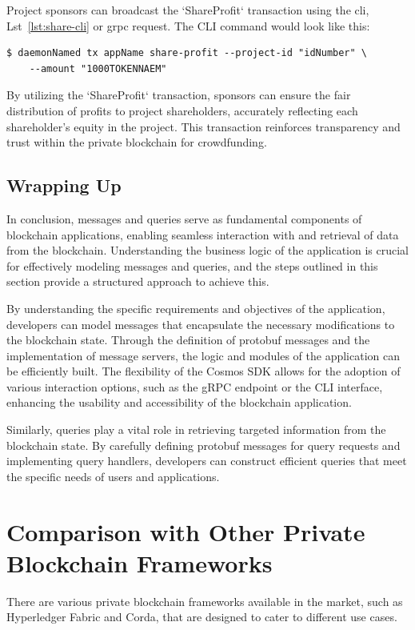 Project sponsors can broadcast the `ShareProfit` transaction using the \gls{cli}, Lst~\ref{lst:share-cli} or \gls{grpc} request. The CLI command would look like this:

\begin{verbatim}
$ daemonNamed tx appName share-profit --project-id "idNumber" \
    --amount "1000TOKENNAEM"
\end{verbatim}

By utilizing the `ShareProfit` transaction, sponsors can ensure the fair distribution of profits to project shareholders, accurately reflecting each shareholder's equity in the project. This transaction reinforces transparency and trust within the private blockchain for crowdfunding.

\subsection{Wrapping Up}

In conclusion, messages and queries serve as fundamental components of blockchain applications, enabling seamless interaction with and retrieval of data from the blockchain. Understanding the business logic of the application is crucial for effectively modeling messages and queries, and the steps outlined in this section provide a structured approach to achieve this.

By understanding the specific requirements and objectives of the application, developers can model messages that encapsulate the necessary modifications to the blockchain state. Through the definition of protobuf messages and the implementation of message servers, the logic and modules of the application can be efficiently built. The flexibility of the Cosmos SDK allows for the adoption of various interaction options, such as the gRPC endpoint or the CLI interface, enhancing the usability and accessibility of the blockchain application.

Similarly, queries play a vital role in retrieving targeted information from the blockchain state. By carefully defining protobuf messages for query requests and implementing query handlers, developers can construct efficient queries that meet the specific needs of users and applications.

\section{Comparison with Other Private Blockchain Frameworks}

There are various private blockchain frameworks available in the market, such as Hyperledger Fabric and Corda, that are designed to cater to different use cases.

